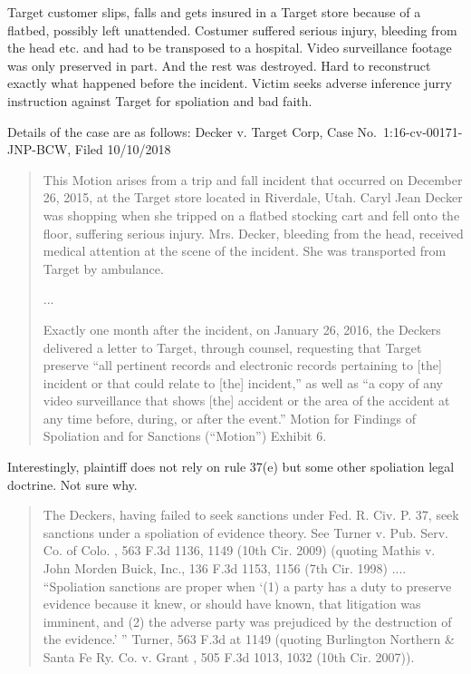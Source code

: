 \documentclass[
  10pt,
  dvipsnames,enabledeprecatedfontcommands]{scrartcl}
\begin{document}
Target customer slips, falls and gets insured  in a
Target store because of a flatbed, possibly left unattended. Costumer
suffered serious injury, bleeding from the head etc. and had to be
transposed to a hospital. Video surveillance footage was only preserved
in part. And the rest was destroyed. Hard to reconstruct exactly what
happened before the incident. Victim seeks adverse inference jurry
instruction against Target for spoliation and bad faith.

Details of the case are as follows: Decker v. Target Corp, Case
No.~1:16-cv-00171-JNP-BCW, Filed 10/10/2018

\begin{quote}
This Motion arises from a trip and fall incident that occurred on December 26, 2015, at the Target store
located in Riverdale, Utah. Caryl Jean Decker was shopping when she tripped on a flatbed stocking cart and
fell onto the floor, suffering serious injury. Mrs. Decker, bleeding from the head, received medical attention at the scene of the incident. She was transported from Target by ambulance.

...

Exactly one month after the incident, on January 26, 2016, the Deckers delivered a letter to Target, through
counsel, requesting that Target preserve “all pertinent records and electronic records pertaining to [the]
incident or that could relate to [the] incident,” as well as “a copy of any video surveillance that shows [the] accident or the area of the accident at any time before, during, or after the event.” Motion for Findings of Spoliation and for Sanctions (“Motion”) Exhibit 6.
\end{quote}

Interestingly, plaintiff does not rely on rule 37(e) but some other
spoliation legal doctrine. Not sure why.

\begin{quote}
The Deckers, having failed to seek sanctions under Fed. R. Civ. P. 37, seek sanctions under a spoliation of
evidence theory. See Turner v. Pub. Serv. Co. of Colo. , 563 F.3d 1136, 1149 (10th Cir. 2009) (quoting Mathis v. John Morden Buick, Inc., 136 F.3d 1153, 1156 (7th Cir. 1998) .... “Spoliation
sanctions are proper when ‘(1) a party has a duty to preserve evidence because it knew, or should have
known, that litigation was imminent, and (2) the adverse party was prejudiced by the destruction of the
evidence.’ ” Turner, 563 F.3d at 1149 (quoting Burlington Northern \& Santa Fe Ry. Co. v. Grant , 505 F.3d
1013, 1032 (10th Cir. 2007)).
\end{quote}
\end{document}
